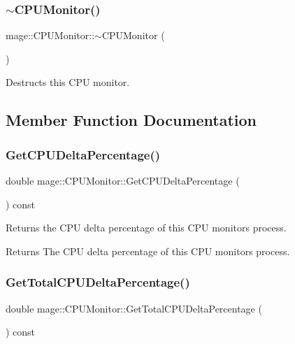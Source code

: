\subsubsection{\texorpdfstring{$\sim$\+C\+P\+U\+Monitor()}{~CPUMonitor()}}
{\footnotesize\ttfamily mage\+::\+C\+P\+U\+Monitor\+::$\sim$\+C\+P\+U\+Monitor (\begin{DoxyParamCaption}{ }\end{DoxyParamCaption})\hspace{0.3cm}{\ttfamily [default]}}

Destructs this C\+PU monitor. 

\subsection{Member Function Documentation}
\hypertarget{classmage_1_1_c_p_u_monitor_a6dc9cbb2eddd284d74fef170b5902faa}{}\label{classmage_1_1_c_p_u_monitor_a6dc9cbb2eddd284d74fef170b5902faa} 
\subsubsection{\texorpdfstring{Get\+C\+P\+U\+Delta\+Percentage()}{GetCPUDeltaPercentage()}}
{\footnotesize\ttfamily double mage\+::\+C\+P\+U\+Monitor\+::\+Get\+C\+P\+U\+Delta\+Percentage (\begin{DoxyParamCaption}{ }\end{DoxyParamCaption}) const}

Returns the C\+PU delta percentage of this C\+PU monitor\textquotesingle{}s process.

\begin{DoxyReturn}{Returns}
The C\+PU delta percentage of this C\+PU monitor\textquotesingle{}s process. 
\end{DoxyReturn}
\hypertarget{classmage_1_1_c_p_u_monitor_a547bdf52bd26df18c1272f732393723b}{}\label{classmage_1_1_c_p_u_monitor_a547bdf52bd26df18c1272f732393723b} 
\subsubsection{\texorpdfstring{Get\+Total\+C\+P\+U\+Delta\+Percentage()}{GetTotalCPUDeltaPercentage()}}
{\footnotesize\ttfamily double mage\+::\+C\+P\+U\+Monitor\+::\+Get\+Total\+C\+P\+U\+Delta\+Percentage (\begin{DoxyParamCaption}{ }\end{DoxyParamCaption}) const}

